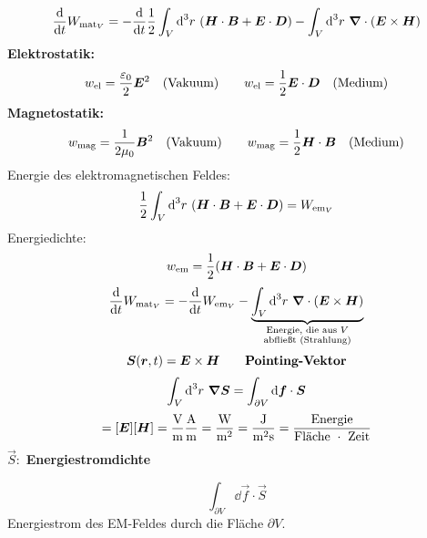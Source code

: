 \begin{equation*}
\frac{\textrm{d} }{\textrm{d} t} W_{\textrm{mat}_V} = - \frac{\textrm{d} }{\textrm{d} t} \frac{1}{2} \int_V \textrm{d}^3r \ (\bm{H} \cdot \bm{B} + \bm{E} \cdot \bm{D}) - \int_V \textrm{d}^3r \ \bm{\nabla} \cdot (\bm{E} \times \bm{H})
\end{equation*}
\textbf{Elektrostatik:}
\begin{equation*}
w_{\textrm{el}} = \frac{\varepsilon_0}{2} \bm{E}^2 \quad (\textrm{Vakuum}) \qquad w_{\textrm{el}} = \frac{1}{2} \bm{E} \cdot \bm{D} \quad (\textrm{Medium})
\end{equation*}
\textbf{Magnetostatik:}
\begin{equation*}
w_{\textrm{mag}} = \frac{1}{2 \mu_0} \bm{B}^2 \quad (\textrm{Vakuum}) \qquad w_{\textrm{mag}} = \frac{1}{2} \bm{H} \cdot \bm{B} \quad (\textrm{Medium})
\end{equation*}
Energie des elektromagnetischen Feldes:
\begin{equation*}
\frac{1}{2} \int_V \dd^3 r \ (\vec{H} \cdot \vec{B} + \vec{E} \cdot \vec{D}) = W_{\tx{em}_V}
\end{equation*}
Energiedichte:
\begin{equation*}
w_{\textrm{em}} = \frac{1}{2} (\bm{H} \cdot \bm{B} + \bm{E} \cdot \bm{D})
\end{equation*}
\begin{equation*}
\prd{}{t} W_{\tx{mat}_V} = - \prd{}{t} W_{\tx{em}_V} - \ub{\int_V \dd^3 r \ \vabla \cdot (\vec{E} \times \vec{H})}_{\mathclap{\substack{\tx{Energie, die aus } V \\ \tx{abfließt (Strahlung)}}}}
\end{equation*}
\begin{equation*}
\bm{S}(\bm{r},t) = \bm{E} \times \bm{H} \qquad \textrm{\textbf{Pointing-Vektor}}
\end{equation*}
\begin{equation*}
\int_V \textrm{d}^3 r \ \bm{\nabla} \bm{S} = \int_{\partial V} \textrm{d}\bm{f}  \cdot \bm{S}
\end{equation*}
\begin{equation*}
[\vec{S}] = [\vec{E}] [\vec{H}] = \frac{\tx{V}}{\tx{m}} \frac{\tx{A}}{\tx{m}} = \frac{\tx{W}}{\tx{m}^2} = \frac{\tx{J}}{\tx{m}^2 \tx{s}} = \frac{\tx{Energie}}{\tx{Fläche } \cdot \tx{ Zeit}}
\end{equation*}
$ \vec{S}: $ \textbf{Energiestromdichte}\\
\begin{minipage}{.8\linewidth}
	$$ \int_{\partial V} \dd \vec{f} \cdot \vec{S} $$
	Energiestrom des EM-Feldes durch die Fläche $ \partial V $.
\end{minipage}%
\begin{minipage}{.2\linewidth}
	\flushright
\end{minipage}%

